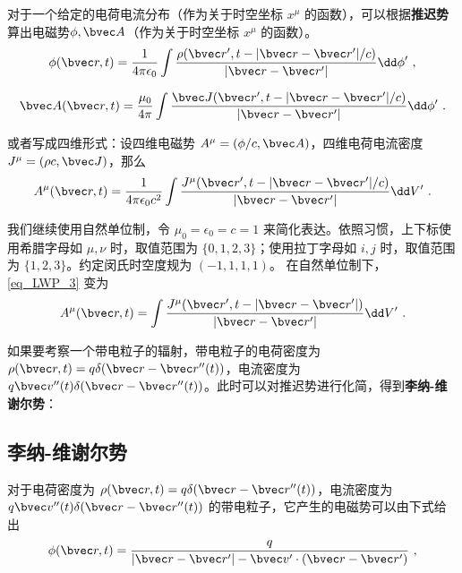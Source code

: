 

对于一个给定的电荷电流分布（作为关于时空坐标 $x^\mu$ 的函数），可以根据\textbf{推迟势}算出电磁势$\phi,\bvec A$（作为关于时空坐标 $x^\mu$ 的函数）。
\begin{equation}
\phi(\bvec r,t)=\frac{1}{4\pi\epsilon_0}\int \frac{\rho(\bvec r',t-|\bvec r-\bvec r'|/c)}{|\bvec r-\bvec r'|}\dd \phi'~,
\end{equation}

\begin{equation}
\bvec A(\bvec r,t)=\frac{\mu_0}{4\pi}\int \frac{\bvec J(\bvec r',t-|\bvec r-\bvec r'|/c)}{|\bvec r-\bvec r'|}\dd \phi'~.
\end{equation}

或者写成四维形式：设四维电磁势 $A^\mu=(\phi/c,\bvec A)$，四维电荷电流密度 $J^\mu=(\rho c,\bvec J)$，那么
\begin{equation}\label{eq_LWP_3}
A^\mu(\bvec r,t)=\frac{1}{4\pi\epsilon_0c^2}\int \frac{J^\mu(\bvec r',t-|\bvec r-\bvec r'|/c)}{|\bvec r-\bvec r'|}\dd V'~.
\end{equation}

我们继续使用自然单位制，令 $\mu_0=\epsilon_0=c=1$ 来简化表达。依照习惯，上下标使用希腊字母如 $\mu, \nu$ 时，取值范围为 $\{0, 1, 2, 3\}$；使用拉丁字母如 $i, j$ 时，取值范围为 $\{1, 2, 3\}$。约定闵氏时空度规为 $(-1,1,1,1)$。
在自然单位制下，\autoref{eq_LWP_3} 变为
\begin{equation}\label{eq_LWP_4}
A^\mu(\bvec r,t)=\int \frac{J^\mu(\bvec r',t-|\bvec r-\bvec r'|)}{|\bvec r-\bvec r'|}\dd V'~.
\end{equation}

如果要考察一个带电粒子的辐射，带电粒子的电荷密度为 $\rho(\bvec r,t)=q\delta(\bvec r-\bvec r''(t))$，电流密度为 $q\bvec v''(t) \delta(\bvec r-\bvec r''(t))$。此时可以对推迟势进行化简，得到\textbf{李纳-维谢尔势}：
\subsection{李纳-维谢尔势}

对于电荷密度为 $\rho(\bvec r,t)=q\delta(\bvec r-\bvec r''(t))$，电流密度为 $q\bvec v''(t) \delta(\bvec r-\bvec r''(t))$ 的带电粒子，它产生的电磁势可以由下式给出
\begin{equation}\label{eq_LWP_1}
\phi(\bvec r,t)=\frac{q}{|\bvec r-\bvec r'|-\bvec v'\cdot (\bvec r-\bvec r')}~,
\end{equation}

